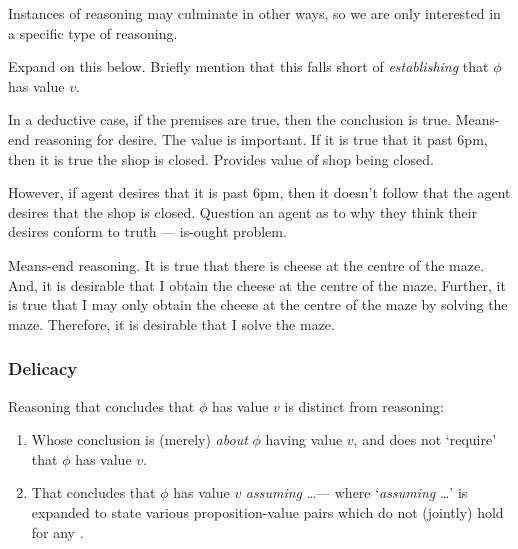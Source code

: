 \begin{note}
  Instances of reasoning may culminate in other ways, so we are only interested in a specific type of reasoning.
\end{note}

\begin{note}
  Expand on this below.
  Briefly mention that this falls short of \emph{establishing} that \(\phi\) has value \(v\).
\end{note}

\begin{note}
  In a deductive case, if the premises are true, then the conclusion is true.
  Means-end reasoning for desire.
  The value is important.
  If it is true that it past 6pm, then it is true the shop is closed.
  Provides value of shop being closed.

  However, if agent desires that it is past 6pm, then it doesn't follow that the agent desires that the shop is closed.
  Question an agent as to why they think their desires conform to truth --- is-ought problem.

  Means-end reasoning.
  It is true that there is cheese at the centre of the maze.
  And, it is desirable that I obtain the cheese at the centre of the maze.
  Further, it is true that I may only obtain the cheese at the centre of the maze by solving the maze.
  Therefore, it is desirable that I solve the maze.
\end{note}

\subsubsection{Delicacy}

\begin{note}
  Reasoning that concludes that \(\phi\) has value \(v\) is distinct from reasoning:
  \begin{enumerate}[label=\Alph*., ref=(\Alph*)]
  \item
    \label{CS:delicacy:O}
    Whose conclusion is (merely) \emph{about} \(\phi\) having value \(v\), and does not `require' that \(\phi\) has value \(v\).
  \item
    \label{CS:delicacy:A}
    That concludes that \(\phi\) has value \(v\) \emph{assuming} \dots\space --- where `\emph{assuming} \dots\space' is expanded to state various proposition-value pairs which do not (jointly) hold for any \epVW{}.
  \end{enumerate}
\end{note}


